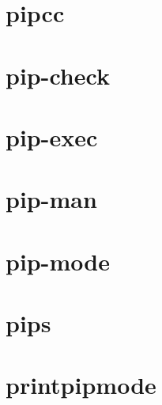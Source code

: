 \section{pipcc}

\section{pip-check}

\section{pip-exec}

\section{pip-man}

\section{pip-mode}

\section{pips}

\section{printpipmode}

